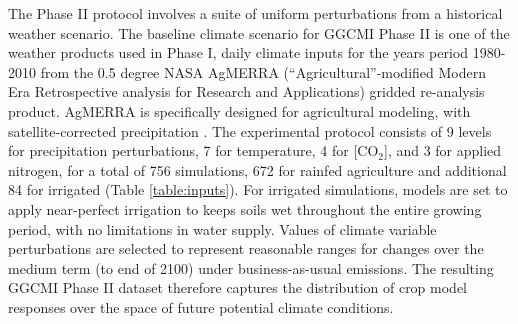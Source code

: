 \documentclass[gmd, manuscript]{copernicus} %
\begin{document}
The Phase II protocol involves a suite of uniform perturbations from a historical weather scenario. 
The baseline climate scenario for GGCMI Phase II is one of the weather products used in Phase I, daily climate inputs for the years period 1980-2010 from the 0.5 degree NASA AgMERRA (``Agricultural''-modified Modern Era Retrospective analysis for Research and Applications) gridded re-analysis product. AgMERRA is specifically designed for agricultural modeling, with satellite-corrected precipitation \citep{Ruane2015}. 
The experimental protocol consists of 9 levels for precipitation perturbations, 7 for temperature, 4 for [CO$_2$], and 3 for applied nitrogen, for a total of 756 simulations, 672 for rainfed agriculture and additional 84 for irrigated (Table \ref{table:inputs}).  For irrigated simulations, models are set to apply near-perfect irrigation to keeps soils wet throughout the entire growing period, with no limitations in water supply. 
Values of climate variable perturbations are selected to represent reasonable ranges for changes over the medium term (to end of 2100) under business-as-usual emissions. 
The resulting GGCMI Phase II dataset therefore captures the distribution of crop model responses over the space of future potential climate conditions.
\end{document}
